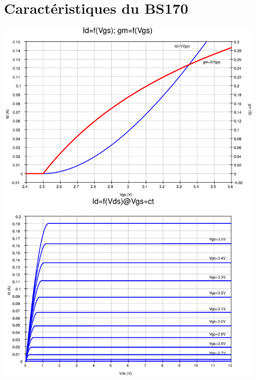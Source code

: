 \documentclass{../template/labo}
\begin{document}
\section{Caractéristiques du BS170}\label{an:bs170}
\centering
\includegraphics[width=\textwidth]{courbes_mos_2k16-crop.pdf}
%
%
%
%
%
\end{document}
